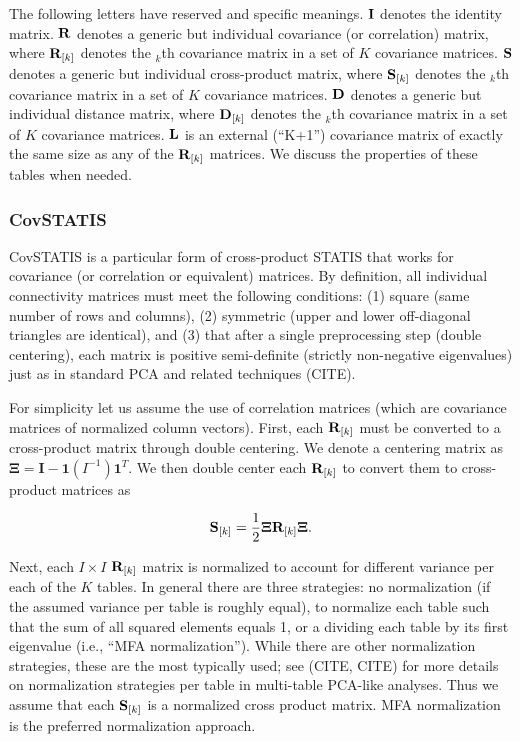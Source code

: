 \documentclass[man]{apa6}
\theoremstyle{definition}
\theoremstyle{definition}
\theoremstyle{definition}
\theoremstyle{remark}
\begin{document}
The following letters have reserved and specific meanings. \({\bf I}\)
denotes the identity matrix. \({\bf R}\) denotes a generic but
individual covariance (or correlation) matrix, where \({\bf R}_{[k]}\)
denotes the \(_k\)th covariance matrix in a set of \(K\) covariance
matrices. \({\bf S}\) denotes a generic but individual cross-product
matrix, where \({\bf S}_{[k]}\) denotes the \(_k\)th covariance matrix
in a set of \(K\) covariance matrices. \({\bf D}\) denotes a generic but
individual distance matrix, where \({\bf D}_{[k]}\) denotes the \(_k\)th
covariance matrix in a set of \(K\) covariance matrices. \({\bf L}\) is
an external (\enquote{K+1}) covariance matrix of exactly the same size
as any of the \({\bf R}_{[k]}\) matrices. We discuss the properties of
these tables when needed.

\hypertarget{covstatis-1}{%
\subsubsection{CovSTATIS}\label{covstatis-1}}

CovSTATIS is a particular form of cross-product STATIS that works for
covariance (or correlation or equivalent) matrices. By definition, all
individual connectivity matrices must meet the following conditions: (1)
square (same number of rows and columns), (2) symmetric (upper and lower
off-diagonal triangles are identical), and (3) that after a single
preprocessing step (double centering), each matrix is positive
semi-definite (strictly non-negative eigenvalues) just as in standard
PCA and related techniques (CITE).

For simplicity let us assume the use of correlation matrices (which are
covariance matrices of normalized column vectors). First, each
\({\bf R}_{[k]}\) must be converted to a cross-product matrix through
double centering. We denote a centering matrix as
\({\boldsymbol \Xi} = \mathbf{I} - \mathbf{1}(I^{-1})\mathbf{1}^{T}\).
We then double center each \({\bf R}_{[k]}\) to convert them to
cross-product matrices as

\begin{equation}
{\bf S}_{[k]} = \frac{1}{2}{\boldsymbol \Xi}{\bf R}_{[k]}{\boldsymbol \Xi}.
\end{equation}

Next, each \(I \times I\) \({\bf R}_{[k]}\) matrix is normalized to
account for different variance per each of the \(K\) tables. In general
there are three strategies: no normalization (if the assumed variance
per table is roughly equal), to normalize each table such that the sum
of all squared elements equals 1, or a dividing each table by its first
eigenvalue (i.e., \enquote{MFA normalization}). While there are other
normalization strategies, these are the most typically used; see (CITE,
CITE) for more details on normalization strategies per table in
multi-table PCA-like analyses. Thus we assume that each
\({\bf S}_{[k]}\) is a normalized cross product matrix. MFA
normalization is the preferred normalization approach.
\end{document}
